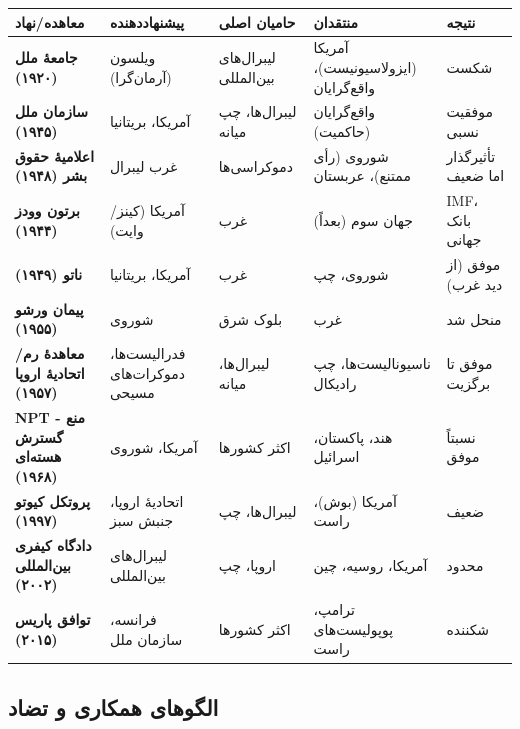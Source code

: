 \begin{longtable}{|p{3cm}|p{2.5cm}|p{2.5cm}|p{2.5cm}|p{3cm}|}
\hline
\rowcolor{rightblue!30}
\textbf{معاهده/نهاد} & \textbf{پیشنهاددهنده} & \textbf{حامیان اصلی} & \textbf{منتقدان} & \textbf{نتیجه} \\
\hline
\endfirsthead

\textbf{جامعهٔ ملل (۱۹۲۰)} & ویلسون (آرمان‌گرا) & لیبرال‌های بین‌المللی & آمریکا (ایزولاسیونیست)، واقع‌گرایان & شکست \\
\hline
\textbf{سازمان ملل (۱۹۴۵)} & آمریکا، بریتانیا & لیبرال‌ها، چپ میانه & واقع‌گرایان (حاکمیت) & موفقیت نسبی \\
\hline
\textbf{اعلامیهٔ حقوق بشر (۱۹۴۸)} & غرب لیبرال & دموکراسی‌ها & شوروی (رأی ممتنع)، عربستان & تأثیرگذار اما ضعیف \\
\hline
\textbf{برتون وودز (۱۹۴۴)} & آمریکا (کینز/وایت) & غرب & جهان سوم (بعداً) & IMF، بانک جهانی \\
\hline
\textbf{ناتو (۱۹۴۹)} & آمریکا، بریتانیا & غرب & شوروی، چپ & موفق (از دید غرب) \\
\hline
\textbf{پیمان ورشو (۱۹۵۵)} & شوروی & بلوک شرق & غرب & منحل شد \\
\hline
\textbf{معاهدهٔ رم/اتحادیهٔ اروپا (۱۹۵۷)} & فدرالیست‌ها، دموکرات‌های مسیحی & لیبرال‌ها، میانه & ناسیونالیست‌ها، چپ رادیکال & موفق تا برگزیت \\
\hline
\textbf{NPT - منع گسترش هسته‌ای (۱۹۶۸)} & آمریکا، شوروی & اکثر کشورها & هند، پاکستان، اسرائیل & نسبتاً موفق \\
\hline
\textbf{پروتکل کیوتو (۱۹۹۷)} & اتحادیهٔ اروپا، جنبش سبز & لیبرال‌ها، چپ & آمریکا (بوش)، راست & ضعیف \\
\hline
\textbf{دادگاه کیفری بین‌المللی (۲۰۰۲)} & لیبرال‌های بین‌المللی & اروپا، چپ & آمریکا، روسیه، چین & محدود \\
\hline
\textbf{توافق پاریس (۲۰۱۵)} & فرانسه، سازمان ملل & اکثر کشورها & ترامپ، پوپولیست‌های راست & شکننده \\
\hline
\end{longtable}

\subsection{الگوهای همکاری و تضاد}

